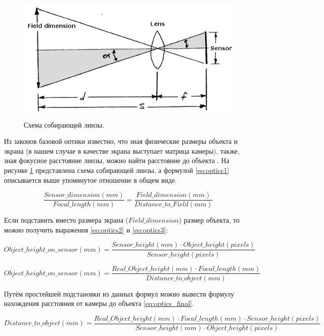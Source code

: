 \documentclass[specification,annotation,times]{itmo-student-thesis}
\begin{document}
\begin{figure}[!ht]
	\caption{Схема собирающей линзы.}\label{img:optic}
	\includegraphics[width=0.85\linewidth]{../png/optic.png}
	\centering
\end{figure}

Из законов базовой оптики известно, что зная физические размеры объекта и экрана (в нашем случае в качестве экрана выступает матрица камеры), также, зная фокусное расстояние линзы, можно найти расстояние до объекта \cite{algebra}. На рисунке \ref{img:optic} представлена схема собирающей линзы, а формулой \ref{eq:optics1} описывается выше упомянутое отношение в общем виде.

\begin{equation}
\mathit{\frac{Sensor\_dimension (mm)} {Focal\_length (mm)} = \frac{Field\_dimension (mm)} {Distance\_to\_Field (mm)}}
\label{eq:optics1}
\end{equation}

Если подставить вместо размера экрана ($Field\_dimension$) размер объекта, то можно получить выражения \ref{eq:optics2} и \ref{eq:optics3}:

\begin{equation}
\mathit{Object\_height\_on\_sensor (mm) = \frac{Sensor\_height (mm)  \cdot  Object\_height (pixels)} {Sensor\_height (pixels)}}
\label{eq:optics2}
\end{equation}

\begin{equation}
\mathit{Object\_height\_on\_sensor (mm) = \frac{Real\_Object\_height (mm) \cdot  Focal\_length (mm)} {Distance\_to\_object (mm)}}
\label{eq:optics3}
\end{equation}

Путём простейшей подстановки из данных формул можно вывести формулу нахождения расстояния от камеры до объекта \ref{eq:optics_final}.


\begin{equation}
\mathit{Distance\_to\_object (mm) = \frac{Real\_Object\_height (mm) \cdot  Focal\_length (mm) \cdot Sensor\_height (pixels)} {Sensor\_height (mm)  \cdot  Object\_height (pixels)}}
\label{eq:optics_final}
\end{equation}
\end{document}
